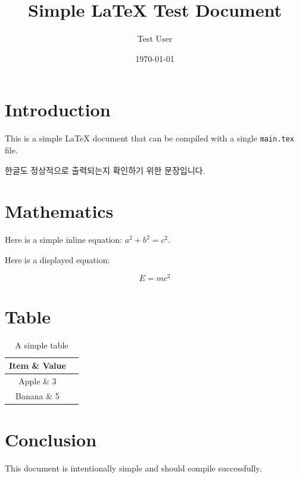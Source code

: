 \documentclass{article}
\title{Simple LaTeX Test Document}
\author{Test User}
\date{\today}
\begin{document}
\maketitle

\section{Introduction}

This is a simple LaTeX document that can be compiled with a single
\texttt{main.tex} file.

한글도 정상적으로 출력되는지 확인하기 위한 문장입니다.



\section{Mathematics}

Here is a simple inline equation: $a^2 + b^2 = c^2$.

Here is a displayed equation:

\[
    E = mc^2
\]

\section{Table}

\begin{table}[h]
    \centering
    \begin{tabular}{|c|c|}
        \hline
        Item \& Value \\
        \hline
        Apple \& 3 \\
        Banana \& 5 \\
        \hline
    \end{tabular}
    \caption{A simple table}
\end{table}

\section{Conclusion}

This document is intentionally simple and should compile successfully.
\wrong
\end{document}
